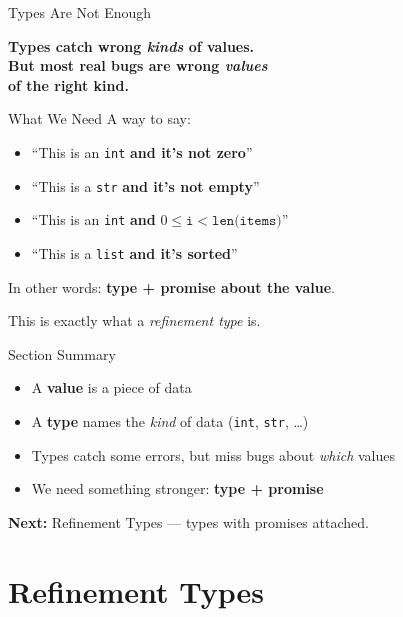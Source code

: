 \documentclass[aspectratio=169,10pt]{beamer}
\newcommand{\hint}[1]{\begin{center}
  \colorbox{hintbg}{\parbox{0.88\textwidth}{\centering\small #1}}\end{center}}
\begin{document}
\begin{frame}{Types Are Not Enough}
\begin{center}
\Large\bfseries
Types catch wrong \emph{kinds} of values.\\[0.5em]
But most real bugs are wrong \emph{values}\\
of the right kind.
\end{center}
\end{frame}

\begin{frame}{What We Need}
A way to say:
\begin{itemize}
  \item ``This is an \texttt{int} \textbf{and it's not zero}''
  \item ``This is a \texttt{str} \textbf{and it's not empty}''
  \item ``This is an \texttt{int} \textbf{and} $0 \le \texttt{i} < \texttt{len(items)}$''
  \item ``This is a \texttt{list} \textbf{and it's sorted}''
\end{itemize}
\vspace{0.5em}
In other words: \textbf{type + promise about the value}.
\hint{This is exactly what a \emph{refinement type} is.}
\end{frame}

\begin{frame}{Section Summary}
\begin{itemize}
  \item A \textbf{value} is a piece of data
  \item A \textbf{type} names the \emph{kind} of data (\texttt{int}, \texttt{str}, \ldots)
  \item Types catch some errors, but miss bugs about \emph{which} values
  \item We need something stronger: \textbf{type + promise}
\end{itemize}
\vspace{0.3em}
\begin{center}
\textbf{Next:} Refinement Types --- types with promises attached.
\end{center}
\end{frame}

\section{Refinement Types}
\end{document}
